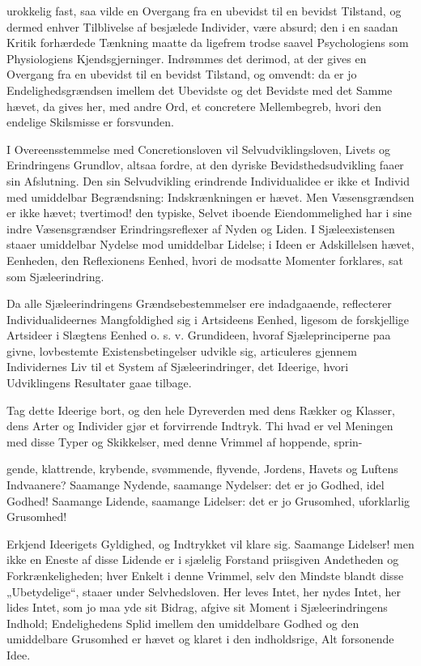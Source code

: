 \documentclass[12pt,a4paper]{book}
\begin{document}
urokkelig fast, saa vilde en Overgang fra en ubevidst til en bevidst Tilstand,
og dermed enhver Tilblivelse af besjælede Individer, være absurd; den i en
saadan Kritik forhærdede Tænkning maatte da ligefrem trodse saavel Psychologiens
som Physiologiens Kjendsgjerninger. Indrømmes det derimod, at der gives en
Overgang fra en ubevidst til en bevidst Tilstand, og omvendt: da er jo
Endelighedsgrændsen imellem det Ubevidste og det Bevidste med det Samme hævet,
da gives her, med andre Ord, et concretere Mellembegreb, hvori den endelige
Skilsmisse er forsvunden.

I Overeensstemmelse med Concretionsloven vil Selvudviklingsloven, Livets og
Erindringens Grundlov, altsaa fordre, at den dyriske Bevidsthedsudvikling faaer
sin Afslutning. Den sin Selvudvikling erindrende Individualidee er ikke et
Individ med umiddelbar Begrændsning: Indskrænkningen er hævet. Men
Væsensgrændsen er ikke hævet; tvertimod! den typiske, Selvet iboende
Eiendommelighed har i sine indre Væsensgrændser Erindringsreflexer af Nyden og
Liden. I Sjæleexistensen staaer umiddelbar Nydelse mod umiddelbar Lidelse; i
Ideen er Adskillelsen hævet, Eenheden, den Reflexionens Eenhed, hvori de
modsatte Momenter forklares, sat som Sjæleerindring.

Da alle Sjæleerindringens Grændsebestemmelser ere indadgaaende, reflecterer
Individualideernes Mangfoldighed sig i Artsideens Eenhed, ligesom de forskjellige
Artsideer i Slægtens Eenhed o. s. v. Grundideen, hvoraf Sjæleprinciperne paa
givne, lovbestemte Existensbetingelser udvikle sig, articuleres gjennem
Individernes Liv til et System af Sjæleerindringer, det Ideerige, hvori
Udviklingens Resultater gaae tilbage.

Tag dette Ideerige bort, og den hele Dyreverden med dens Rækker og Klasser, dens
Arter og Individer gjør et forvirrende Indtryk. Thi hvad er vel Meningen med
disse Typer og Skikkelser, med denne Vrimmel af hoppende, sprin-

gende, klattrende, krybende, svømmende, flyvende, Jordens, Havets og Luftens
Indvaanere? Saamange Nydende, saamange Nydelser: det er jo Godhed, idel Godhed!
Saamange Lidende, saamange Lidelser: det er jo Grusomhed, uforklarlig Grusomhed!

Erkjend Ideerigets Gyldighed, og Indtrykket vil klare sig. Saamange Lidelser!
men ikke en Eneste af disse Lidende er i sjælelig Forstand priisgiven Andetheden
og Forkrænkeligheden; hver Enkelt i denne Vrimmel, selv den Mindste blandt disse
„Ubetydelige“, staaer under Selvhedsloven. Her leves Intet, her nydes Intet, her
lides Intet, som jo maa yde sit Bidrag, afgive sit Moment i Sjæleerindringens
Indhold; Endelighedens Splid imellem den umiddelbare Godhed og den umiddelbare
Grusomhed er hævet og klaret i den indholdsrige, Alt forsonende Idee.
\end{document}
